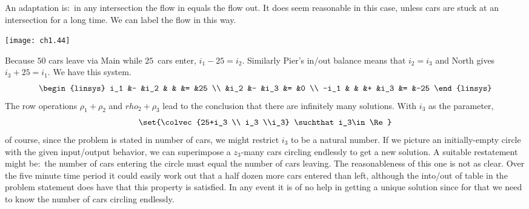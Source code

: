 \begin{ans}{5}
      \begin{exparts}
        \partsitem
           An adaptation is:~in any intersection the flow in equals the
           flow out.
           It does seem reasonable in this case, unless cars are stuck at
           an intersection for a long time.
        \partsitem
           We can label the flow in this way.
           \begin{center}
             \texttt{[image: ch1.44]}
           \end{center}
           Because $50$ cars leave via Main while $25$~cars enter,
           $i_1-25=i_2$.
           Similarly Pier's in/out balance means that $i_2=i_3$ and
           North gives $i_3+25=i_1$.
           We have this system.
           \begin{equation*}
             \begin{linsys}{3}
               i_1  &-  &i_2  &   &     &=  &25  \\
                        &i_2  &-  &i_3  &=  &0   \\
              -i_1  &   &     &+  &i_3  &=  &-25
             \end{linsys}
           \end{equation*}
        \partsitem
           The row operations $\rho_1+\rho_2$ and $rho_2+\rho_3$ lead
           to the conclusion that there are infinitely many solutions.
           With $i_3$ as the parameter,
           \begin{equation*}
             \set{\colvec{25+i_3  \\ i_3  \\i_3} \suchthat i_3\in\Re}
           \end{equation*}
           of course, since the problem is stated in number of cars, we
           might restrict $i_3$ to be a natural number.
        \partsitem
           If we picture an initially-empty circle with the given input/output
           behavior, we can superimpose a $z_3$-many cars circling endlessly
           to get a new solution.
        \partsitem
           A suitable restatement might be:~the number of cars entering the
           circle must equal the number of cars leaving.
           The reasonableness of this one is not as clear.
           Over the five minute time period it could easily work out that
           a half dozen more cars entered than left,
           although the into/out of table in the problem statement
           does have that this property is satisfied.
           In any event it is of no help in getting a unique solution
           since for that we need to know the number of cars circling
           endlessly.
      \end{exparts}
    
\end{ans}
